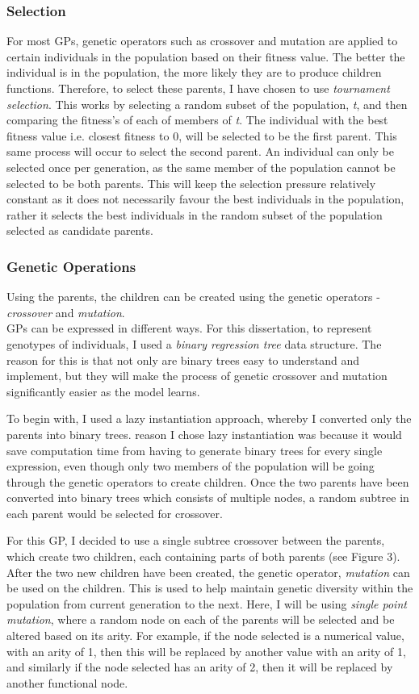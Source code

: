 \documentclass[11pt]{article}
\begin{document}
\subsubsection{Selection}
For most GPs, genetic operators such as crossover and mutation are applied to certain individuals in the population based on their fitness value. The better the individual is in the population, the more likely they are to produce children functions. Therefore,
to select these parents, I have chosen to use \textit{tournament selection}\cite{?}. This works by selecting a random subset of the population, \textit{t}, and then comparing the fitness's of each of members of \textit{t}. The individual with the best fitness value i.e. closest fitness to 0, will be selected to be the first parent. This same process will occur to select the second parent. An individual can only be selected once per generation, as the same member of the population cannot be selected to be both parents. This will keep the selection pressure relatively constant as it does not necessarily favour the best individuals in the population, rather it selects the best individuals in the random subset of the population selected as candidate parents. 
\subsubsection{Genetic Operations}
Using the parents, the children can be created using the genetic operators -\textit{crossover} and \textit{mutation}.\\
GPs can be expressed in different ways. For this dissertation, to represent genotypes of individuals, I used a \textit{binary regression tree} data structure. The reason for this is that not only are binary trees easy to understand and implement, but they will make the process of genetic crossover and mutation significantly easier as the model learns. 

To begin with, I used a lazy instantiation approach, whereby I converted only the parents into binary trees. reason I chose lazy instantiation was because it would save computation time from having to generate binary trees for every single expression, even though only two members of the population will be going through the genetic operators to create children. Once the two parents have been converted into binary trees which consists of multiple nodes, a random subtree in each parent would be selected for crossover.

For this GP, I decided to use a single subtree crossover between the parents, which create two children, each containing parts of both parents (see Figure 3).
After the two new children have been created, the genetic operator,  \textit{mutation} can be used on the children. This is used to help maintain genetic diversity within the population from current generation to the next.  Here, I will be using \textit{single point mutation}, where a random node on each of the parents will be selected and be altered based on its arity. For example, if the node selected is a numerical value, with an arity of 1, then this will be replaced by another value with an arity of 1, and similarly if the node selected has an arity of 2, then it will be replaced by another functional node.
\end{document}
